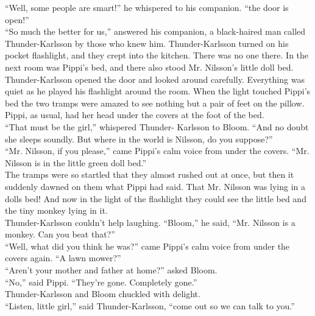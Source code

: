 \documentclass{standard}
\begin{document}
“Well, some people are smart!” he whispered to his companion. “the door is open!”\\

“So much the better for us,” answered his companion, a black-haired man called Thunder-Karlsson by those who knew him. Thunder-Karlsson turned on his pocket flashlight, and they crept into the kitchen. There was no one there. In the next room was Pippi’s bed, and there also stood Mr. Nilsson’s little doll bed.\\

Thunder-Karlsson opened the door and looked around carefully. Everything was quiet as he played his flashlight around the room. When the light touched Pippi’s bed the two tramps were amazed to see nothing but a pair of feet on the pillow. Pippi, as usual, had her head under the covers at the foot of the bed.\\

“That must be the girl,” whispered Thunder- Karlsson to Bloom. “And no doubt she sleeps soundly. But where in the world is Nilsson, do you suppose?”\\

“Mr. Nilsson, if you please,” came Pippi’s calm voice from under the covers. “Mr. Nilsson is in the little green doll bed.”\\

The tramps were so startled that they almost rushed out at once, but then it suddenly dawned on them what Pippi had said. That Mr. Nilsson was lying in a dolls bed! And now in the light of the flashlight they could see the little bed and the tiny monkey lying in it.\\

Thunder-Karlsson couldn’t help laughing. “Bloom,” he said, “Mr. Nilsson is a monkey. Can you beat that?”\\

“Well, what did you think he was?” came Pippi’s calm voice from under the covers again. “A lawn mower?”\\

“Aren’t your mother and father at home?” asked Bloom.\\

“No,” said Pippi. “They’re gone. Completely gone.”\\

Thunder-Karlsson and Bloom chuckled with delight.\\

“Listen, little girl,” said Thunder-Karlsson, “come out so we can talk to you.”\\
\end{document}
